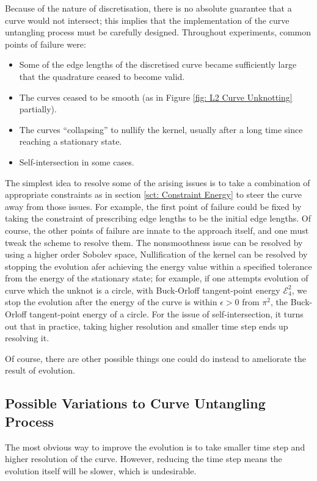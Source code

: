 \documentclass[../dissertation.tex]{subfiles}
\begin{document}
Because of the nature of discretisation, there is no absolute guarantee that a curve would not intersect;
this implies that the implementation of the curve untangling process must be carefully designed.
Throughout experiments, common points of failure were:
\begin{itemize}
    \item Some of the edge lengths of the discretised curve became sufficiently large that the quadrature ceased to become valid.
    \item The curves ceased to be smooth (as in Figure \ref{fig: L2 Curve Unknotting} partially).
    \item The curves ``collapsing'' to nullify the kernel, usually after a long time since reaching a stationary state.
    \item Self-intersection in some cases.
\end{itemize}

The simplest idea to resolve some of the arising issues is to take a combination of appropriate constraints as in section \ref{sct: Constraint Energy} to steer the curve away from those issues.
For example, the first point of failure could be fixed by taking the constraint of prescribing edge lengths to be the initial edge lengths. 
Of course, the other points of failure are innate to the approach itself,
and one must tweak the scheme to resolve them.
The nonsmoothness issue can be resolved by using a higher order Sobolev space,
Nullification of the kernel can be resolved by stopping the evolution afer achieving the energy value within a specified tolerance from the energy of the stationary state;
for example, if one attempts evolution of curve which the unknot is a circle, with Buck-Orloff tangent-point energy $\mathcal{E}_{4}^{2}$, we stop the evolution after the energy of the curve is within $\epsilon > 0$ from $\pi^2$,
the Buck-Orloff tangent-point energy of a circle.
For the issue of self-intersection,
it turns out that in practice, taking higher resolution and smaller time step ends up resolving it.

Of course, there are other possible things one could do instead to ameliorate the result of evolution.

\subsection{Possible Variations to Curve Untangling Process}
The most obvious way to improve the evolution is to take smaller time step and higher resolution of the curve.
However, reducing the time step means the evolution itself will be slower, which is undesirable.
\end{document}
